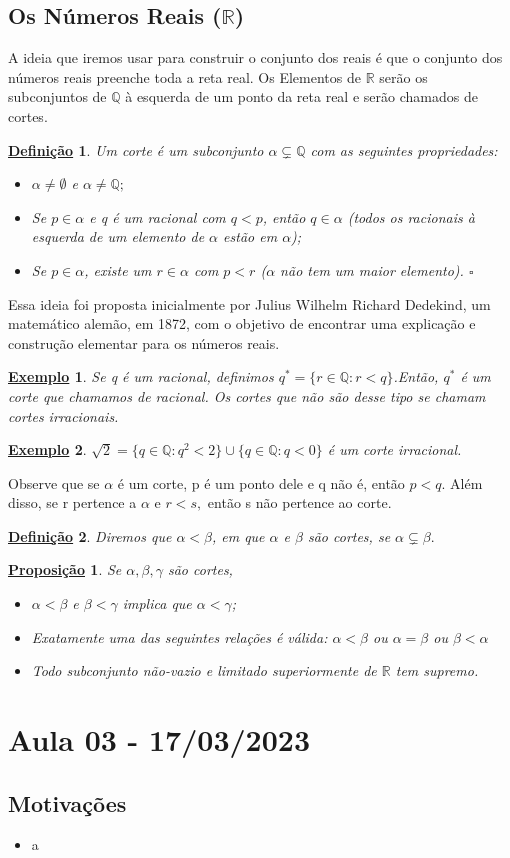 \documentclass{article}
\newtheorem*{def*}{\underline{Defini\c c\~ao}}
\newtheorem*{prop*}{\underline{Proposi\c c\~ao}}
\newtheorem{example}{\underline{Exemplo}}
\begin{document}
\subsection{Os N\'umeros Reais ($\mathbb{R}$)}
  A ideia que iremos usar para construir o conjunto dos reais \'e que o conjunto dos n\'umeros reais preenche toda a reta real. Os Elementos
de $\mathbb{R}$ ser\~ao os subconjuntos de $\mathbb{Q}$ \`a esquerda de um ponto da reta real e ser\~ao chamados de cortes.
 \begin{def*}
   Um corte \'e um subconjunto $\alpha\subsetneq \mathbb{Q}$ com as seguintes propriedades:
  \begin{itemize}
    \item[i)] $\alpha\neq \emptyset$ e $\alpha \neq \mathbb{Q};$
    \item[ii)] Se $p\in \alpha$ e q \'e um racional com $q < p$, ent\~ao $q\in \alpha$ (todos os racionais \`a esquerda de um elemento
      de $\alpha$ est\~ao em $\alpha$);
    \item[iii)] Se $p\in \alpha$, existe um $r\in \alpha$ com $p < r$ ($\alpha$ n\~ao tem um maior elemento). $\square$
  \end{itemize}
 \end{def*}
  Essa ideia foi proposta inicialmente por Julius Wilhelm Richard Dedekind, um matem\'atico alem\~ao, em 1872, com o objetivo de encontrar uma explica\c c\~ao
e constru\c c\~ao elementar para os n\'umeros reais.
\begin{example}
  Se q \'e um racional, definimos $q^{*} = \{r\in \mathbb{Q}: r < q\}$.Ent\~ao, $q^{*}$ \'e um corte que chamamos de racional. Os 
cortes que n\~ao s\~ao desse tipo se chamam cortes irracionais.
\end{example}
\begin{example}
  $\sqrt{2} = \{q\in \mathbb{Q}: q^{2} < 2\}\cup \{q\in \mathbb{Q}: q < 0\}$ \'e um corte irracional.
\end{example}
  Observe que se $\alpha$ \'e um corte, p \'e um ponto dele e q n\~ao \'e, ent\~ao $p < q$. Al\'em disso, se r pertence a $\alpha$
e $r < s,$ ent\~ao s n\~ao pertence ao corte.
\begin{def*}
  Diremos que $\alpha < \beta$, em que $\alpha$ e $\beta$ s\~ao cortes, se $\alpha\subsetneq \beta.$
\end{def*}
\begin{prop*}
  Se $\alpha, \beta, \gamma$ s\~ao cortes,
 \begin{itemize}
   \item[i)] $\alpha < \beta$ e $\beta < \gamma$ implica que $\alpha < \gamma$;
   \item[ii)] Exatamente uma das seguintes rela\c c\~oes \'e v\'alida: $\alpha < \beta$ ou $\alpha = \beta$ ou $\beta < \alpha$
   \item[iii)] Todo subconjunto n\~ao-vazio e limitado superiormente de $\mathbb{R}$ tem supremo.
 \end{itemize}
\end{prop*}

\section{Aula 03 - 17/03/2023}
\subsection{Motiva\c c\~oes}
\begin{itemize}
  \item a
\end{itemize}
\end{document}
